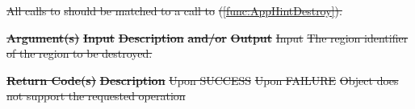 \documentclass[12pt]{report} %
\providecommand{\DIFdeltex}[1]{{\protect\color{red}\sout{#1}}}                      %
\providecommand{\DIFdel}[1]{\texorpdfstring{\DIFdeltex{#1}}{}} %
\begin{document}
\DIFdel{All calls to }%
\DIFdel{should be matched to a call to }%
\DIFdel{(\ref{func:AppHintDestroy}). 
}%


\textbf{\DIFdel{Argument(s)}} %
\textbf{\DIFdel{Input}}  %
\textbf{\DIFdel{Description}} %
\textbf{\DIFdel{and/or}}     %
\textbf{\DIFdel{Output}} %
\DIFdel{Input }%
\DIFdel{The region identifier of the region to be destroyed. }%

\textbf{\DIFdel{Return Code(s)}} %
\textbf{\DIFdel{Description}} %
\DIFdel{Upon SUCCESS }%
\DIFdel{Upon FAILURE }%
\DIFdel{Object does not support the requested operation }%
\end{document}

